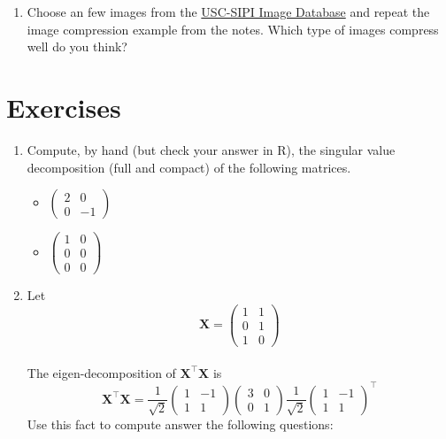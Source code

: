 \documentclass[]{book}
\providecommand{\tightlist}{%
  \setlength{\itemsep}{0pt}\setlength{\parskip}{0pt}}
\theoremstyle{definition}
\theoremstyle{definition}
\theoremstyle{definition}
\theoremstyle{remark}
\begin{document}
\begin{enumerate}
\def\labelenumi{\arabic{enumi}.}
\setcounter{enumi}{2}
\tightlist
\item
  Choose an few images from the \href{http://sipi.usc.edu/database/}{USC-SIPI Image Database} and repeat the image compression example from the notes. Which type of images compress well do you think?
\end{enumerate}

\hypertarget{exercises-ch3}{%
\section{Exercises}\label{exercises-ch3}}

\begin{enumerate}
\def\labelenumi{\arabic{enumi}.}
\tightlist
\item
  Compute, by hand (but check your answer in R), the singular value decomposition (full and compact) of the following matrices.

  \begin{itemize}
  \tightlist
  \item
    \(\left(\begin{array}{cc}2&0\\0&-1\end{array} \right)\)
  \item
    \(\left(\begin{array}{cc}1&0\\0&0\\0&0\end{array} \right)\)
  \end{itemize}
\item
  Let \[\boldsymbol X=\left(\begin{array}{cc}1&1\\0&1\\1&0\end{array}
  \right)\]\\
  The eigen-decomposition of \(\boldsymbol X^\top \boldsymbol X\) is
  \[\boldsymbol X^\top \boldsymbol X=\frac{1}{\sqrt{2}}\left(\begin{array}{cc}1&-1\\1&1\end{array}
  \right) \left(\begin{array}{cc}3&0\\0&1\end{array}
  \right)\frac{1}{\sqrt{2}}\left(\begin{array}{cc}1&-1\\1&1\end{array}
  \right)^\top \]
  Use this fact to compute answer the following questions:


\end{enumerate}
\end{document}
